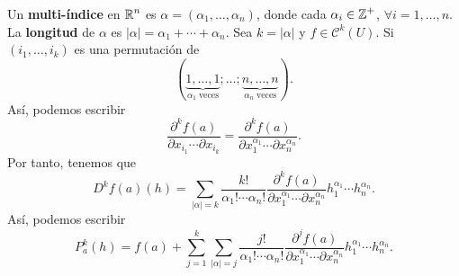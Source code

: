 \begin{notation}
Un \textbf{multi-índice} en $\displaystyle \mathbb{R}^{n} $ es $\displaystyle \alpha = \left(\alpha_{1}, \ldots, \alpha_{n}\right) $, donde cada $\displaystyle \alpha_{i} \in \mathbb{Z}^{+} $, $\displaystyle \forall i = 1, \ldots, n $. La \textbf{longitud} de $\displaystyle \alpha  $ es $\displaystyle \left|\alpha \right|= \alpha_{1} + \cdots + \alpha_{n} $. Sea $\displaystyle k = \left|\alpha \right| $ y $\displaystyle f \in \mathcal{C}^{k}\left(U\right) $. Si $\displaystyle \left(i_{1}, \ldots, i_{k}\right) $ es una permutación de 
\[(\underbrace{1, \ldots, 1}_{\alpha_{1} \; \text{veces}}; \ldots; \underbrace{n, \ldots, n}_{\alpha_{n}\; \text{veces}}) .\]
Así, podemos escribir
\[\frac{\partial^{k}f\left(a\right)}{\partial x_{i_{1}} \cdots \partial x_{i_{k}}} = \frac{\partial^{k}f\left(a\right)}{\partial x_{1}^{\alpha_{1}} \cdots \partial x_{n}^{\alpha_{n}}} .\]
Por tanto, tenemos que
\[D^{k}f\left(a\right)\left(h\right) = \sum_{ \left|\alpha \right|=k}\frac{k!}{\alpha_{1}! \cdots \alpha_{n}!}\frac{\partial^{k}f\left(a\right)}{\partial x_{1}^{\alpha_{1}} \cdots \partial x_{n}^{\alpha_{n}}}h_{1}^{\alpha_{1}} \cdots h_{n}^{\alpha_{n}} .\]
Así, podemos escribir
\[P_{a}^{k}\left(h\right) = f\left(a\right) + \sum^{k}_{j = 1}\sum_{ \left|\alpha \right|=j}\frac{j!}{\alpha_{1}! \cdots \alpha_{n}!}\frac{\partial^{j}f\left(a\right)}{\partial x_{1}^{\alpha_{1}} \cdots \partial x_{n}^{\alpha_{n}}}h_{1}^{\alpha_{1}} \cdots h_{n}^{\alpha_{n}} .\]
\end{notation}
